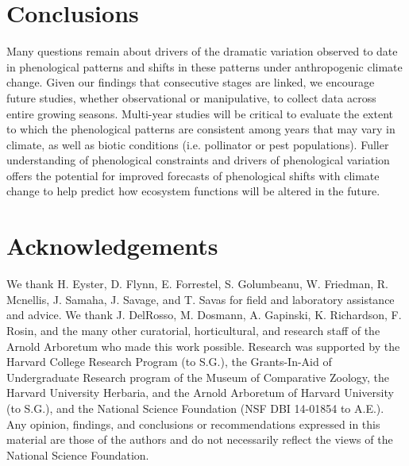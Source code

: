 \documentclass{article}
\begin{document}

\section* {Conclusions}
Many questions remain about drivers of the dramatic variation observed to date in phenological patterns and shifts in these patterns under anthropogenic climate change. Given our findings that consecutive stages are linked, we encourage future studies, whether observational or manipulative, to collect data across entire growing seasons. Multi-year studies will be critical to evaluate the extent to which the phenological patterns are consistent among years that may vary in climate, as well as biotic conditions (i.e. pollinator or pest populations).  %
Fuller understanding of phenological constraints and drivers of phenological variation offers the potential for improved forecasts of phenological shifts  with climate change to help predict how ecosystem functions will be altered in the future.



\section*{Acknowledgements} %
We thank H. Eyster, D. Flynn, E. Forrestel, S. Golumbeanu, W. Friedman, R. Mcnellis, J. Samaha, J. Savage, and T. Savas for field and laboratory assistance and advice. We thank J. DelRosso, M. Dosmann, A. Gapinski, K. Richardson, F. Rosin, and the many other curatorial, horticultural, and research staff of the Arnold Arboretum who made this work possible. Research was supported by the Harvard College Research Program (to S.G.), the Grants-In-Aid of Undergraduate Research program of the Museum of Comparative Zoology, the Harvard University Herbaria, and the Arnold Arboretum of Harvard University (to S.G.), and the National Science Foundation (NSF DBI 14-01854 to A.E.). Any opinion, findings, and conclusions or recommendations expressed in this material are those of the authors and do not necessarily reflect the views of the National Science Foundation.
\end{document}
